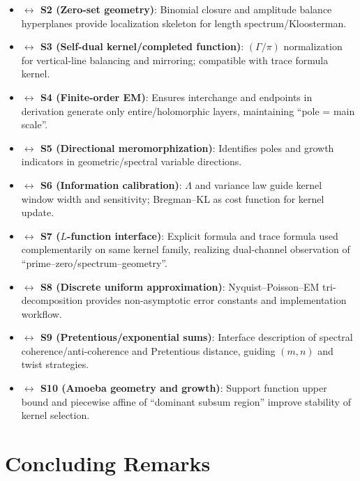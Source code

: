 \documentclass[11pt,a4paper]{article}
\theoremstyle{remark}
\begin{document}
\begin{itemize}
\item \textbf{$\leftrightarrow$ S2 (Zero-set geometry)}: Binomial closure and amplitude balance hyperplanes provide localization skeleton for length spectrum/Kloosterman.

\item \textbf{$\leftrightarrow$ S3 (Self-dual kernel/completed function)}: $(\Gamma/\pi)$ normalization for vertical-line balancing and mirroring; compatible with trace formula kernel.

\item \textbf{$\leftrightarrow$ S4 (Finite-order EM)}: Ensures interchange and endpoints in derivation generate only entire/holomorphic layers, maintaining ``pole = main scale''.

\item \textbf{$\leftrightarrow$ S5 (Directional meromorphization)}: Identifies poles and growth indicators in geometric/spectral variable directions.

\item \textbf{$\leftrightarrow$ S6 (Information calibration)}: $\Lambda$ and variance law guide kernel window width and sensitivity; Bregman--KL as cost function for kernel update.

\item \textbf{$\leftrightarrow$ S7 ($L$-function interface)}: Explicit formula and trace formula used complementarily on same kernel family, realizing dual-channel observation of ``prime--zero/spectrum--geometry''.

\item \textbf{$\leftrightarrow$ S8 (Discrete uniform approximation)}: Nyquist--Poisson--EM tri-decomposition provides non-asymptotic error constants and implementation workflow.

\item \textbf{$\leftrightarrow$ S9 (Pretentious/exponential sums)}: Interface description of spectral coherence/anti-coherence and Pretentious distance, guiding $(m,n)$ and twist strategies.

\item \textbf{$\leftrightarrow$ S10 (Amoeba geometry and growth)}: Support function upper bound and piecewise affine of ``dominant subsum region'' improve stability of kernel selection.
\end{itemize}

\section*{Concluding Remarks}
\end{document}

